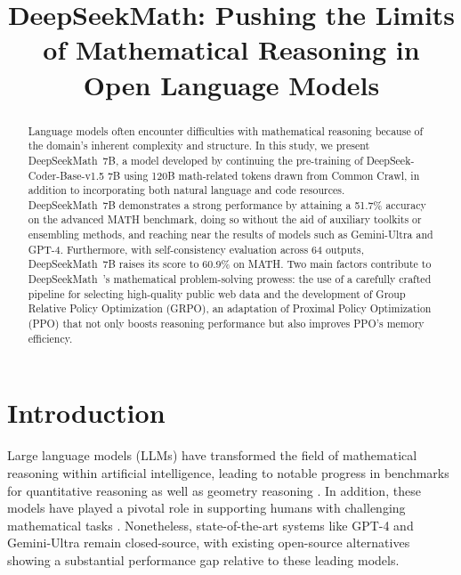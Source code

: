 \title{DeepSeekMath: Pushing the Limits of Mathematical Reasoning in Open Language Models}

\begin{abstract}
Language models often encounter difficulties with mathematical reasoning because of the domain’s inherent complexity and structure. In this study, we present DeepSeekMath~7B, a model developed by continuing the pre-training of DeepSeek-Coder-Base-v1.5 7B using 120B math-related tokens drawn from Common Crawl, in addition to incorporating both natural language and code resources. DeepSeekMath~7B demonstrates a strong performance by attaining a 51.7\% accuracy on the advanced MATH benchmark, doing so without the aid of auxiliary toolkits or ensembling methods, and reaching near the results of models such as Gemini-Ultra and GPT-4. Furthermore, with self-consistency evaluation across 64 outputs, DeepSeekMath~7B raises its score to 60.9\% on MATH. Two main factors contribute to DeepSeekMath~’s mathematical problem-solving prowess: the use of a carefully crafted pipeline for selecting high-quality public web data and the development of Group Relative Policy Optimization (GRPO), an adaptation of Proximal Policy Optimization (PPO) that not only boosts reasoning performance but also improves PPO’s memory efficiency.
\end{abstract}

\section{Introduction}

Large language models (LLMs) have transformed the field of mathematical reasoning within artificial intelligence, leading to notable progress in benchmarks for quantitative reasoning \citep{MATH} as well as geometry reasoning \citep{trinh2024solving}. In addition, these models have played a pivotal role in supporting humans with challenging mathematical tasks \citep{tao}. Nonetheless, state-of-the-art systems like GPT-4 \citep{gpt4} and Gemini-Ultra \citep{gemini} remain closed-source, with existing open-source alternatives showing a substantial performance gap relative to these leading models.

